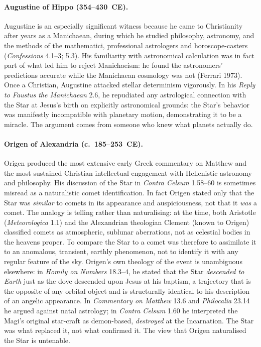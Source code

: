 \documentclass[11pt,a4paper]{article}
\begin{document}
\paragraph{Augustine of Hippo (354--430~CE).}
Augustine is an especially significant witness because he came to Christianity after years as
a Manichaean, during which he studied philosophy, astronomy, and the methods of the
mathematici, professional astrologers and horoscope-casters (\textit{Confessions} 4.1--3; 5.3).
His familiarity with astronomical calculation was in fact part of what led him to reject
Manichaeism: he found the astronomers' predictions accurate while the Manichaean cosmology
was not (Ferrari 1973). Once a Christian, Augustine attacked stellar determinism vigorously.
In his \textit{Reply to Faustus the Manichaean} 2.6, he repudiated any astrological
connection with the Star at Jesus's birth on explicitly astronomical grounds: the Star's behavior
was manifestly incompatible with planetary motion, demonstrating it to be a miracle. The
argument comes from someone who knew what planets actually do.

\paragraph{Origen of Alexandria (c.~185--253~CE).}
Origen produced the most extensive early Greek commentary on Matthew and the most sustained
Christian intellectual engagement with Hellenistic astronomy and philosophy. His discussion
of the Star in \textit{Contra Celsum} 1.58--60 is sometimes misread as a naturalistic comet
identification. In fact Origen stated only that the Star was \emph{similar} to comets in its
appearance and auspiciousness, not that it \emph{was} a comet. The analogy is telling rather
than naturalising: at the time, both Aristotle (\textit{Meteorologica} 1.1) and the Alexandrian
theologian Clement (known to Origen) classified comets as atmospheric, sublunar aberrations,
not as celestial bodies in the heavens proper. To compare the Star to a comet was therefore
to assimilate it to an anomalous, transient, earthly phenomenon, not to identify it with any
regular feature of the sky. Origen's own theology of the event is unambiguous elsewhere:
in \textit{Homily on Numbers} 18.3--4, he stated that the Star \emph{descended to Earth}
just as the dove descended upon Jesus at his baptism, a trajectory that is the opposite of
any orbital object and is structurally identical to his description of an angelic appearance.
In \textit{Commentary on Matthew} 13.6 and \textit{Philocalia} 23.14 he argued against natal
astrology; in \textit{Contra Celsum} 1.60 he interpreted the Magi's original star-craft as
demon-based, \emph{destroyed} at the Incarnation. The Star was what replaced it, not what
confirmed it. The view that Origen naturalised the Star is untenable.
\end{document}
